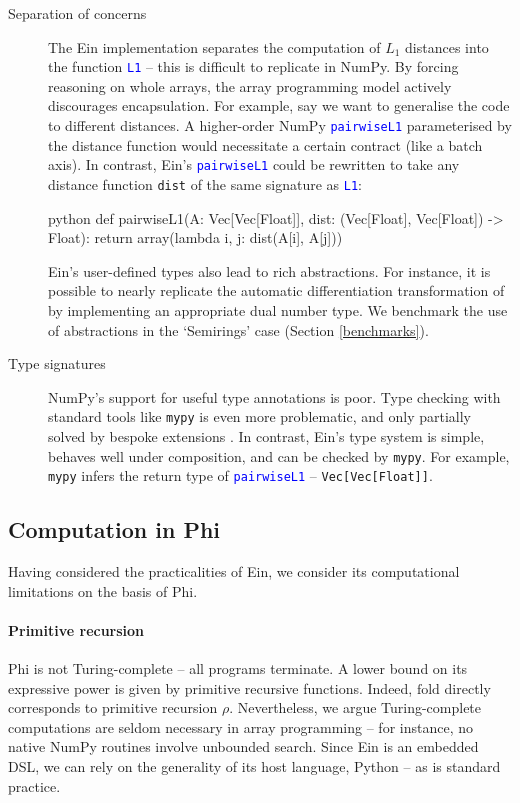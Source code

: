 \begin{description}
    \item[Separation of concerns] The Ein implementation separates the computation of $L_1$ distances into the function \textcolor{blue}{\texttt{L1}} -- this is difficult to replicate in NumPy. By forcing reasoning on whole arrays, the array programming model actively discourages encapsulation. For example, say we want to generalise the code to different distances. A higher-order NumPy \textcolor{blue}{\texttt{pairwiseL1}} parameterised by the distance function would necessitate a certain contract (like a batch axis). In contrast, Ein's \textcolor{blue}{\texttt{pairwiseL1}} could be rewritten to take any distance function \texttt{dist} of the same signature as \textcolor{blue}{\texttt{L1}}:
    \begin{center}
    \begin{cminted}{python}
def pairwiseL1(A: Vec[Vec[Float]], dist: (Vec[Float], Vec[Float]) -> Float):
    return array(lambda i, j: dist(A[i], A[j]))
    \end{cminted}
    \end{center}
    Ein's user-defined types also lead to rich abstractions. For instance, it is possible to nearly replicate the automatic differentiation transformation of \textcite{shaikhha2019efficient} by implementing an appropriate dual number type. We benchmark the use of abstractions in the `Semirings' case (Section \ref{benchmarks}).
    \item[Type signatures] NumPy's support for useful type annotations is poor. Type checking with standard tools like \texttt{mypy} is even more problematic, and only partially solved by bespoke extensions \cite{liu2020type}. In contrast, Ein's type system is simple, behaves well under composition, and can be checked by \texttt{mypy}. For example, \texttt{mypy} infers the return type of \textcolor{blue}{\texttt{pairwiseL1}} -- \texttt{Vec[Vec[Float]]}. 
\end{description}

\subsection{Computation in Phi}

Having considered the practicalities of Ein, we consider its computational limitations on the basis of Phi. 

\paragraph{Primitive recursion} 
Phi is not Turing-complete -- all programs terminate. 
A lower bound on its expressive power is given by primitive recursive functions. 
Indeed, $\mathrm{fold}$ directly corresponds to primitive recursion $\rho$. 
Nevertheless, we argue Turing-complete computations are seldom necessary in array programming -- for instance, no native NumPy routines involve unbounded search. 
Since Ein is an embedded DSL, we can rely on the generality of its host language, Python -- as is standard practice. 

